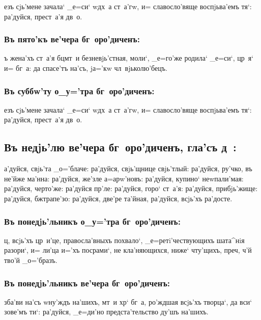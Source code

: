 \documentclass[14pt,twoside]{extreport}
\renewcommand{\*}{~~\raise3pt\hbox{\footnotesize*}}
\begin{document}
езъ сjь'мене зачала` _е=си` w\т дх~а ст~а'гw, и= славосло'вяще
воспjьва'емъ тя`: ра'дуйся, прест~а'я дв~о.

\subsubsection{Въ пято'къ ве'чера бг~оро'диченъ:}

ъ жена'хъ ст~а'я бц мт~и безневjь'стная, моли`, _е=го'же родила`
_е=си`, цр~я` и= бг~а: да спасе'тъ на'съ, jа='кw чл~вjьколю'бецъ.

\subsubsection{Въ суббw'ту о_у='тра бг~оро'диченъ:}

езъ сjь'мене зачала` _е=си` w\т дх~а ст~а'гw, и= славосло'вяще
воспjьва'емъ тя`: ра'дуйся, прест~а'я дв~о.

\delimpict

\subsection[Гла'съ д~]{Въ недjь'лю ве'чера бг~оро'диченъ, гла'съ д~:}

а'дуйся, свjь'та _о='блаче: ра'дуйся, свjь'щнице свjь'тлый: ра'дуйся,
ру'чко, въ не'йже ма'нна: ра'\-дуй\-ся, же'зле а=арw'новъ: ра'дуйся, купино`
неwпали'мая: ра'дуйся, черто'же: ра'дуйся пр'ле: ра'дуйся, горо` ст~а'я:
ра'дуйся, прибjь'жище: ра'дуйся, бж трапе'зо: ра'дуйся, две'ре
та'йная, ра'дуйся, всjь'хъ ра'досте.

\subsubsection{Въ понедjь'льникъ о_у='тра бг~оро'диченъ:}

ц, всjь'хъ цр~и'це, правосла'вныхъ похвало`, _е=ретi'чествующихъ
шата^нiя разори`, и= ли'ца и='хъ посрами`, не кла'няющихся, ниже` чту'щихъ,
пре\-ч, ч'й тво'й _о='бразъ.

\subsubsection{Въ понедjь'льникъ ве'чера бг~оро'диченъ:}

зба'ви на'съ w\т ну'ждъ на'шихъ, мт~и хр` бг~а, ро'ждшая всjь'хъ
творца`, да вси` зове'мъ ти`: ра'дуйся, _е=ди'но предста'тельство ду'шъ
на'шихъ.
\end{document}
